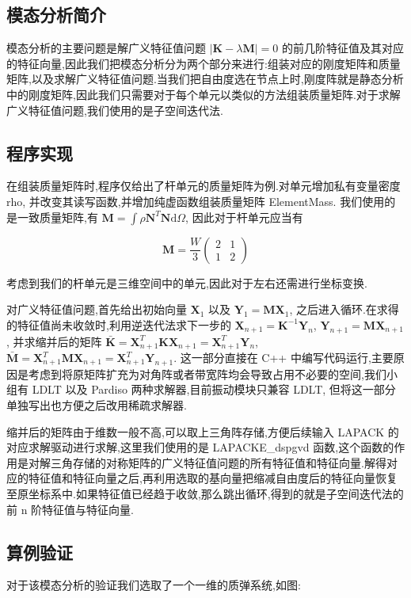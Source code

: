 
\subsection{模态分析简介}
模态分析的主要问题是解广义特征值问题 $|\mathbf{K}-\lambda\mathbf{M}|=0$ 的前几阶特征值及其对应的特征向量,因此我们把模态分析分为两个部分来进行:组装对应的刚度矩阵和质量矩阵,以及求解广义特征值问题.当我们把自由度选在节点上时,刚度阵就是静态分析中的刚度矩阵,因此我们只需要对于每个单元以类似的方法组装质量矩阵.对于求解广义特征值问题,我们使用的是子空间迭代法.
\subsection{程序实现}
在组装质量矩阵时,程序仅给出了杆单元的质量矩阵为例.对单元增加私有变量密度 rho, 并改变其读写函数,并增加纯虚函数组装质量矩阵 ElementMass. 我们使用的是一致质量矩阵,有 $\mathbf{M}=\int\rho\mathbf{N}^T\mathbf{N}\mathrm{d}\Omega$, 因此对于杆单元应当有

\[
\mathbf{M}=\frac{W}{3}\left(\begin{array}{cc} 2&1\\1&2 \end{array} \right)
\]

考虑到我们的杆单元是三维空间中的单元,因此对于左右还需进行坐标变换.

对广义特征值问题,首先给出初始向量 $\mathbf{X}_1$ 以及 $\mathbf{Y}_1=\mathbf{M}\mathbf{X}_1$, 之后进入循环.在求得的特征值尚未收敛时,利用逆迭代法求下一步的 $\mathbf{X}_{n+1}=\mathbf{K}^{-1}\mathbf{Y}_n$, $\mathbf{Y}_{n+1}=\mathbf{M}\mathbf{X}_{n+1}$, 并求缩并后的矩阵 $\bar{\mathbf{K}}=\mathbf{X}_{n+1}^T\mathbf{K}\mathbf{X}_{n+1}=\mathbf{X}_{n+1}^T\mathbf{Y}_n$,  $\bar{\mathbf{M}}=\mathbf{X}_{n+1}^T\mathbf{M}\mathbf{X}_{n+1}=\mathbf{X}_{n+1}^T\mathbf{Y}_{n+1}$. 这一部分直接在 C++ 中编写代码运行,主要原因是考虑到将原矩阵扩充为对角阵或者带宽阵均会导致占用不必要的空间,我们小组有 LDLT 以及 Pardiso 两种求解器,目前振动模块只兼容 LDLT, 但将这一部分单独写出也方便之后改用稀疏求解器.

缩并后的矩阵由于维数一般不高,可以取上三角阵存储,方便后续输入 LAPACK 的对应求解驱动进行求解,这里我们使用的是 LAPACKE\_dspgvd 函数,这个函数的作用是对解三角存储的对称矩阵的广义特征值问题的所有特征值和特征向量.解得对应的特征值和特征向量之后,再利用选取的基向量把缩减自由度后的特征向量恢复至原坐标系中.如果特征值已经趋于收敛,那么跳出循环,得到的就是子空间迭代法的前 n 阶特征值与特征向量.

\subsection{算例验证}
对于该模态分析的验证我们选取了一个一维的质弹系统,如图:

